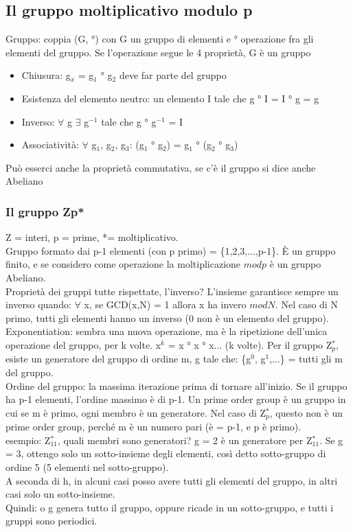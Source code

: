 \documentclass[16px]{article}
\begin{document}
\subsection{Il gruppo moltiplicativo modulo p}
Gruppo: coppia (G, °) con G un gruppo di elementi e ° operazione fra gli elementi del gruppo. Se l'operazione segue le 4 proprietà, G è un gruppo
\begin{itemize}
\item Chiusura: g$_x$ = g$_1$ ° g$_2$ deve far parte del gruppo
\item Esistenza del elemento neutro: un elemento I tale che g ° I = I ° g = g
\item Inverso: $\forall$ g $\exists$ g$^{-1}$ tale che g ° g$^{-1}$ = I
\item Associatività: $\forall$ g$_1$, g$_2$, g$_3$: (g$_1$ ° g$_2$) = g$_1$ ° (g$_2$ ° g$_3$)
\end{itemize}
Può esserci anche la proprietà commutativa, se c'è il gruppo si dice anche Abeliano
\subsubsection{Il gruppo Zp*}
Z = interi, p = prime, *= moltiplicativo.\\ Gruppo formato dai p-1 elementi (con p primo) = \{1,2,3,...,p-1\}. È un gruppo finito, e se considero come operazione la moltiplicazione $modp$ è un gruppo Abeliano.\\ Proprietà dei gruppi tutte rispettate, l'inverso? L'insieme garantisce sempre un inverso quando: $\forall$ x, se GCD(x,N) = 1 allora x ha invero $modN$. Nel caso di N primo, tutti gli elementi hanno un inverso (0 non è un elemento del gruppo).\\ Exponentiation: sembra una nuova operazione, ma è la ripetizione dell'unica operazione del gruppo, per k volte. x$^k$ = x ° x ° x... (k volte). Per il gruppo Z$_p^*$, esiste un generatore del gruppo di ordine m, g tale che: \{g$^0$, g$^1$,...\} = tutti gli m del gruppo.\\ Ordine del gruppo: la massima iterazione prima di tornare all'inizio. Se il gruppo ha p-1 elementi, l'ordine massimo è di p-1. Un prime order group è un gruppo in cui se m è primo, ogni membro è un generatore. Nel caso di Z$_p^*$, questo non è un prime order group, perché m è un numero pari (è = p-1, e p è primo).\\ esempio: Z$_11^*$, quali membri sono generatori? g = 2 è un generatore per Z$_11^*$. Se g = 3, ottengo solo un sotto-insieme degli elementi, così detto sotto-gruppo di ordine 5 (5 elementi nel sotto-gruppo).\\ A seconda di h, in alcuni casi posso avere tutti gli elementi del gruppo, in altri casi solo un sotto-insieme.\\ Quindi: o g genera tutto il gruppo, oppure ricade in un sotto-gruppo, e tutti i gruppi sono periodici.
\end{document}
